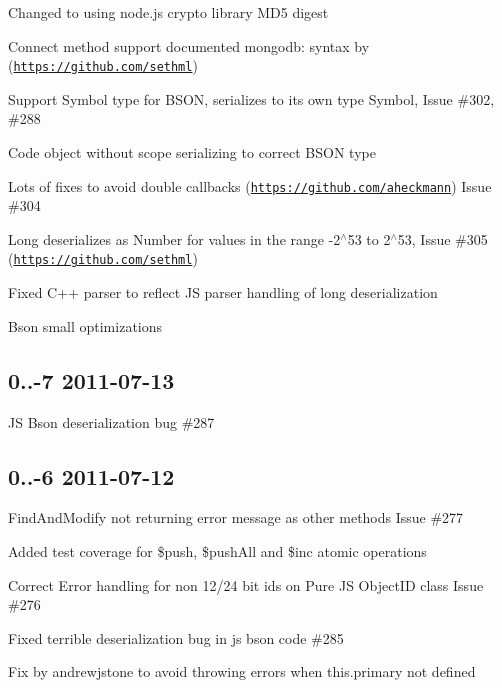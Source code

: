 \begin{DoxyItemize}
\item Changed to using node.\+js crypto library M\+D5 digest
\item Connect method support documented mongodb\+: syntax by (\href{https://github.com/sethml}{\tt https\+://github.\+com/sethml})
\item Support Symbol type for B\+S\+ON, serializes to it\textquotesingle{}s own type Symbol, Issue \#302, \#288
\item Code object without scope serializing to correct B\+S\+ON type
\item Lot\textquotesingle{}s of fixes to avoid double callbacks (\href{https://github.com/aheckmann}{\tt https\+://github.\+com/aheckmann}) Issue \#304
\item Long deserializes as Number for values in the range -\/2$^\wedge$53 to 2$^\wedge$53, Issue \#305 (\href{https://github.com/sethml}{\tt https\+://github.\+com/sethml})
\item Fixed C++ parser to reflect JS parser handling of long deserialization
\item Bson small optimizations
\end{DoxyItemize}

\subsection*{0..-\/7 2011-\/07-\/13 }


\begin{DoxyItemize}
\item JS Bson deserialization bug \#287
\end{DoxyItemize}

\subsection*{0..-\/6 2011-\/07-\/12 }


\begin{DoxyItemize}
\item Find\+And\+Modify not returning error message as other methods Issue \#277
\item Added test coverage for \$push, \$push\+All and \$inc atomic operations
\item Correct Error handling for non 12/24 bit ids on Pure JS Object\+ID class Issue \#276
\item Fixed terrible deserialization bug in js bson code \#285
\item Fix by andrewjstone to avoid throwing errors when this.\+primary not defined
\end{DoxyItemize}

